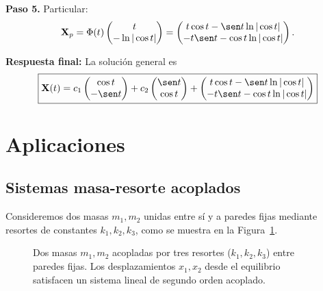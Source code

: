\begin{example}
\begin{myproof}
\textbf{Paso 5.} Particular:
\[
\mathbf{X}_p=\Phi(t)
\begin{pmatrix}
t\\
-\ln|\cos t|
\end{pmatrix}
=
\begin{pmatrix}
t\cos t-\sen t\ln|\cos t|\\
-t\sen t-\cos t\ln|\cos t|
\end{pmatrix}.
\]

\textbf{Respuesta final:} La solución general es
\[
\boxed{
\mathbf{X}(t)=c_1
\begin{pmatrix}
\cos t\\-\sen t
\end{pmatrix}
+c_2
\begin{pmatrix}
\sen t\\\cos t
\end{pmatrix}
+
\begin{pmatrix}
t\cos t-\sen t\ln|\cos t|\\
-t\sen t-\cos t\ln|\cos t|
\end{pmatrix}
}
\]
\end{myproof}
\end{example}

\section{Aplicaciones}

\subsection{Sistemas masa-resorte acoplados}

Consideremos dos masas $m_1,m_2$ unidas entre sí y a paredes fijas mediante resortes de constantes $k_1,k_2,k_3$, como se muestra en la Figura~\ref{fig:masas_acopladas}.

\begin{figure}[!htbp]
\centering
{}
\caption{Dos masas $m_1,m_2$ acopladas por tres resortes ($k_1,k_2,k_3$) entre paredes fijas. Los desplazamientos $x_1,x_2$ desde el equilibrio satisfacen un sistema lineal de segundo orden acoplado.}
\label{fig:masas_acopladas}
\end{figure}

